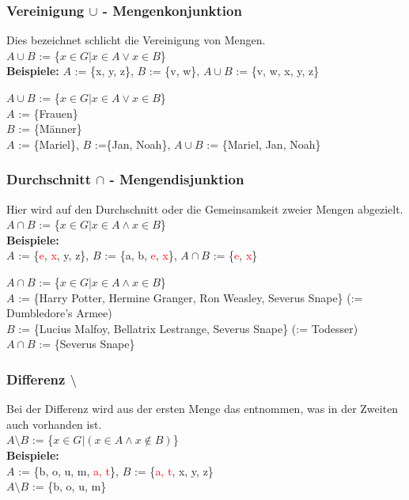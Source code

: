 \documentclass[a4paper,12pt]{article}
\begin{document}
\subsubsection{Vereinigung $\cup$ - Mengenkonjunktion}
Dies bezeichnet schlicht die Vereinigung von Mengen. \\
$A \cup B$ := \{$x \in G | x \in A \lor x \in B$\} \\
\textbf{Beispiele:} $A$ := \{x, y, z\}, $B$ := \{v, w\}, $A \cup B$ := \{v, w, x, y, z\}

$A \cup B$ := \{$x \in G | x \in A \lor x \in B$\} \\
$A$ := \{Frauen\} \\
$B$ := \{Männer\} \\
$A$ := \{Mariel\}, $B$ :=\{Jan, Noah\}, $A \cup B$ := \{Mariel, Jan, Noah\}

\subsubsection{Durchschnitt $\cap$ - Mengendisjunktion}
Hier wird auf den Durchschnitt oder die Gemeinsamkeit zweier Mengen abgezielt. \\
$A \cap B$ := \{$x \in G | x \in A \land x \in B$\} \\
\textbf{Beispiele:} \\
$A$ := \{\textcolor{red}{e}, \textcolor{red}{x}, y, z\}, $B$ := \{a, b, \textcolor{red}{e}, \textcolor{red}{x}\}, $A \cap B$ := \{\textcolor{red}{e}, \textcolor{red}{x}\}

$A \cap B$ := \{$x \in G | x \in A \land x \in B$\} \\
$A$ := \{Harry Potter, Hermine Granger, Ron Weasley, Severus Snape\} (:= Dumbledore's Armee) \\
$B$ := \{Lucius Malfoy, Bellatrix Lestrange, Severus Snape\} (:= Todesser) \\
$A \cap B$ := \{Severus Snape\}

\subsubsection{Differenz $\setminus$}
Bei der Differenz wird aus der ersten Menge das entnommen, was in der Zweiten auch vorhanden ist. \\
$A \setminus B$ := \{$x \in G | (x \in A \land x \not\in B)$\} \\
\textbf{Beispiele:}\\ 
$A$ := \{b, o, u, m, \textcolor{red}{a, t}\}, $B$ := \{\textcolor{red}{a, t}, x, y, z\} \\
$A \setminus B$ := \{b, o, u, m\}
\end{document}
